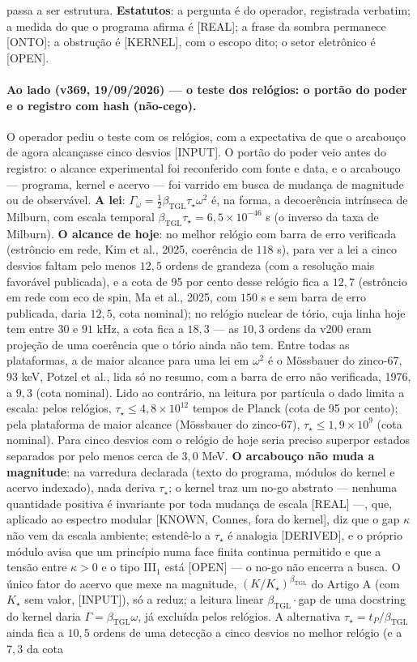\documentclass[11pt]{article}
\newcommand{\bTGL}{\beta_{\mathrm{TGL}}}\newcommand{\Msun}{M_{\odot}}\newcommand{\TGL}{\mathrm{TGL}}
\theoremstyle{definition}\newtheorem{deriv}{Derivação}
\begin{document}
passa a ser estrutura. \textbf{Estatutos}: a pergunta é do operador, registrada verbatim; a medida do que o programa afirma é [REAL]; a frase da sombra permanece [ONTO]; a obstrução é [KERNEL], com o escopo dito; o setor eletrônico é [OPEN].

\paragraph*{Ao lado (v369, 19/09/2026) --- o teste dos relógios: o portão do poder e o registro com hash (não-cego).} O operador pediu o teste com os relógios, com a expectativa de que o arcabouço de agora alcançasse cinco desvios [INPUT]. O portão do poder veio antes do registro: o alcance experimental foi reconferido com fonte e data, e o arcabouço --- programa, kernel e acervo --- foi varrido em busca de mudança de magnitude ou de observável. \textbf{A lei}: $\Gamma_\omega=\tfrac12\bTGL\tau_\star\omega^2$ é, na forma, a decoerência intrínseca de Milburn, com escala temporal $\bTGL\tau_\star=6{,}5\times10^{-46}$ s (o inverso da taxa de Milburn). \textbf{O alcance de hoje}: no melhor relógio com barra de erro verificada (estrôncio em rede, Kim et al., 2025, coerência de $118$ s), para ver a lei a cinco desvios faltam pelo menos $12{,}5$ ordens de grandeza (com a resolução mais favorável publicada), e a cota de 95 por cento desse relógio fica a $12{,}7$ (estrôncio em rede com eco de spin, Ma et al., 2025, com $150$ s e sem barra de erro publicada, daria $12{,}5$, cota nominal); no relógio nuclear de tório, cuja linha hoje tem entre $30$ e $91$ kHz, a cota fica a $18{,}3$ --- as $10{,}3$ ordens da v200 eram projeção de uma coerência que o tório ainda não tem. Entre todas as plataformas, a de maior alcance para uma lei em $\omega^2$ é o Mössbauer do zinco-67, 93 keV, Potzel et al., lida só no resumo, com a barra de erro não verificada, 1976, a $9{,}3$ (cota nominal). Lido ao contrário, na leitura por partícula o dado limita a escala: pelos relógios, $\tau_\star\le 4{,}8\times10^{12}$ tempos de Planck (cota de 95 por cento); pela plataforma de maior alcance (Mössbauer do zinco-67), $\tau_\star\le 1{,}9\times10^{9}$ (cota nominal). Para cinco desvios com o relógio de hoje seria preciso superpor estados separados por pelo menos cerca de $3{,}0$ MeV. \textbf{O arcabouço não muda a magnitude}: na varredura declarada (texto do programa, módulos do kernel e acervo indexado), nada deriva $\tau_\star$; o kernel traz um no-go abstrato --- nenhuma quantidade positiva é invariante por toda mudança de escala [REAL] ---, que, aplicado ao espectro modular [KNOWN, Connes, fora do kernel], diz que o gap $\kappa$ não vem da escala ambiente; estendê-lo a $\tau_\star$ é analogia [DERIVED], e o próprio módulo avisa que um princípio numa face finita continua permitido e que a tensão entre $\kappa>0$ e o tipo III$_1$ está [OPEN] --- o no-go não encerra a busca. O único fator do acervo que mexe na magnitude, $(K/K_\star)^{\bTGL}$ do Artigo A (com $K_\star$ sem valor, [INPUT]), só a reduz; a leitura linear $\bTGL\cdot$gap de uma docstring do kernel daria $\Gamma=\bTGL\omega$, já excluída pelos relógios. A alternativa $\tau_\star=t_P/\bTGL$ ainda fica a $10{,}5$ ordens de uma detecção a cinco desvios no melhor relógio (e a $7{,}3$ da cota 
\end{document}
